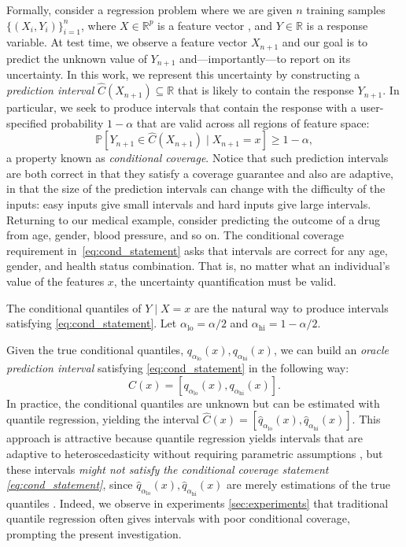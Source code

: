 \documentclass{article}
\begin{document}
Formally, consider a regression problem where we are given $n$ training samples $\{(X_i,Y_i)\}_{i=1}^n$, where $X\in\mathbb{R}^p$ is a feature vector
, and $Y\in\mathbb{R}$ is a response variable.
At test time, we observe a feature vector $X_{n+1}$ and our goal is to predict the unknown value of $Y_{n+1}$ and---importantly---to report on its uncertainty. In this work, we represent this uncertainty by
constructing a \emph{prediction interval} $\hat{C}(X_{n+1}) \subseteq \mathbb{R}$ that is likely to contain the response $Y_{n+1}$. In particular, we seek to produce intervals that contain the response with a user-specified probability $1-\alpha$ that are valid across all regions of feature space:
\begin{equation}\label{eq:cond_statement}
\mathbb{P}[Y_{n+1}\in \hat{C}(X_{n+1}) \mid X_{n+1}=x]\geq 1-\alpha,
\end{equation}
a property known as \emph{conditional coverage}. Notice that such prediction intervals are both correct in that they satisfy a coverage guarantee and also are adaptive, in that the size of the prediction intervals can change with the difficulty of the inputs: easy inputs give small intervals and hard inputs give large intervals.
Returning to our medical example, consider predicting the outcome of a drug from age, gender, blood pressure, and so on. The conditional coverage requirement in~\eqref{eq:cond_statement} asks that intervals are correct for any age, gender, and health status combination. That is, no matter what an individual's value of the features $x$, the uncertainty quantification must be valid.

The conditional quantiles of $Y \mid X = x$ are the natural way to produce intervals satisfying \eqref{eq:cond_statement}. Let $\alpha_{\textrm{lo}} = \alpha/2$ and $\alpha_{\textrm{hi}} = 1-\alpha/2$.

Given the true conditional quantiles, $q_{\alpha_{\textrm{lo}}}(x), q_{\alpha_{\textrm{hi}}}(x)$, we can build an \emph{oracle prediction interval} satisfying \eqref{eq:cond_statement} in the following way:
\begin{equation}\label{eq:oracle_intervals}
C(x)= [q_{\alpha_{\textrm{lo}}}(x), q_{\alpha_{\textrm{hi}}}(x)].
\end{equation}
In practice, the conditional quantiles are unknown but can be estimated with quantile regression, yielding the interval $\hat{C}(x) = [\hat{q}_{\alpha_{\textrm{lo}}}(x), \hat{q}_{\alpha_{\textrm{hi}}}(x)]$. This approach is attractive because quantile regression yields intervals that are adaptive to heteroscedasticity without requiring parametric assumptions \cite{non_parametric_qr, qr_conf_sets, hetero_qr}, but these intervals \emph{might not satisfy the conditional coverage statement \eqref{eq:cond_statement}}, since $\hat{q}_{\alpha_{\textrm{lo}}}(x), \hat{q}_{\alpha_{\textrm{hi}}}(x)$ are merely estimations of the true quantiles \cite{barber2019limits}. Indeed, we observe in experiments \ref{sec:experiments} that traditional quantile regression often gives intervals with poor conditional coverage, prompting the present investigation.
\end{document}
